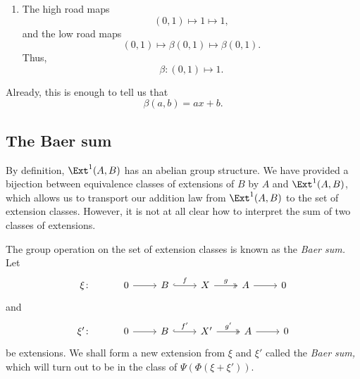 \documentclass[main.tex]{subfiles}
\begin{document}
\begin{example}
\begin{enumerate}[label=(\arabic*)]
    \item The high road maps
      \begin{equation*}
        (0, 1) \mapsto 1 \mapsto 1,
      \end{equation*}
      and the low road maps
      \begin{equation*}
        (0, 1) \mapsto \beta(0, 1) \mapsto \beta(0, 1).
      \end{equation*}
      Thus, 
      \begin{equation*}
        \beta\colon (0, 1) \mapsto 1.
      \end{equation*}
  \end{enumerate}
  Already, this is enough to tell us that
  \begin{equation*}
    \beta(a, b) = ax + b.
  \end{equation*}
\end{example}

\subsection{The Baer sum}
\label{ssc:baer_sum}

By definition, $\Ext^{1}(A, B)$ has an abelian group structure. We have provided a bijection between equivalence classes of extensions of $B$ by $A$ and $\Ext^{1}(A, B)$, which allows us to transport our addition law from $\Ext^{1}(A, B)$ to the set of extension classes. However, it is not at all clear how to interpret the sum of two classes of extensions.

The group operation on the set of extension classes is known as the \emph{Baer sum.} Let
\begin{equation*}
  \begin{tikzcd}
    \xi\colon
    & 0
    \arrow[r]
    & B
    \arrow[r, hook, "f"]
    & X
    \arrow[r, two heads, "g"]
    & A
    \arrow[r]
    & 0
  \end{tikzcd}
\end{equation*}
and
\begin{equation*}
  \begin{tikzcd}
    \xi'\colon
    & 0
    \arrow[r]
    & B
    \arrow[r, hook, "f'"]
    & X'
    \arrow[r, two heads, "g'"]
    & A
    \arrow[r]
    & 0
  \end{tikzcd}
\end{equation*}
be extensions. We shall form a new extension from $\xi$ and $\xi'$ called the \emph{Baer sum,} which will turn out to be in the class of $\Psi(\Phi(\xi + \xi'))$.
\end{document}
